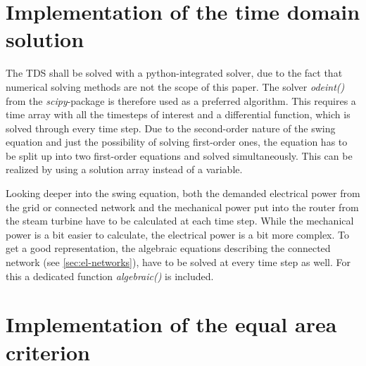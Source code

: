 \section{Implementation of the time domain solution}
\label{sec:tds}

The \acs{TDS} shall be solved with a python-integrated solver, due to the fact that numerical solving methods are not the scope of this paper. The solver {\itshape odeint()} from the {\itshape scipy}-package is therefore used as a preferred algorithm. This requires a time array with all the timesteps of interest and a differential function, which is solved through every time step. Due to the second-order nature of the swing equation and just the possibility of solving first-order ones, the equation has to be split up into two first-order equations and solved simultaneously. This can be realized by using a solution array instead of a variable. 

Looking deeper into the swing equation, both the demanded electrical power from the grid or connected network and the mechanical power put into the router from the steam turbine have to be calculated at each time step. While the mechanical power is a bit easier to calculate,
the electrical power is a bit more complex. To get a good representation, the algebraic equations describing the connected network (see \autoref{sec:el-networks}), have to be solved at every time step as well. For this a dedicated function {\itshape algebraic()} is included.

% 

\section{Implementation of the equal area criterion}
\label{sec:eac}


